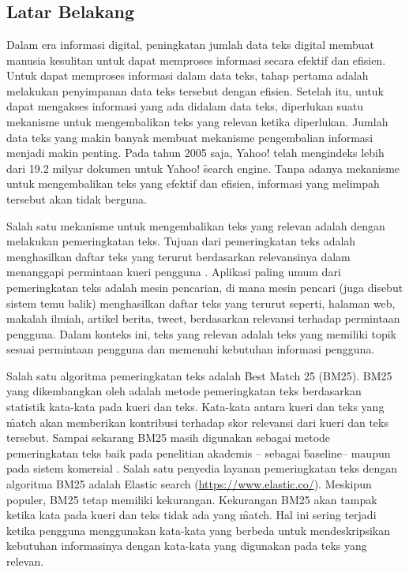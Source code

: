 \chapter{\babSatu}
\label{bab:1}

\section{Latar Belakang}
\label{sec:latar-belakang}

Dalam era informasi digital, peningkatan jumlah data teks digital membuat manusia kesulitan untuk dapat memproses informasi secara efektif dan efisien. Untuk dapat memproses informasi dalam data teks, tahap pertama adalah melakukan penyimpanan data teks tersebut dengan efisien. Setelah itu, untuk dapat mengakses informasi yang ada didalam data teks, diperlukan suatu mekanisme untuk mengembalikan teks yang relevan ketika diperlukan. Jumlah data teks yang makin banyak membuat mekanisme pengembalian informasi menjadi makin penting. Pada tahun 2005 saja, Yahoo! telah mengindeks lebih dari 19.2 milyar dokumen \citep{LETOR} untuk Yahoo! \f{search engine}. Tanpa adanya mekanisme untuk mengembalikan teks yang efektif dan efisien, informasi yang melimpah tersebut akan tidak berguna.

Salah satu mekanisme untuk mengembalikan teks yang relevan adalah dengan melakukan pemeringkatan teks. Tujuan dari pemeringkatan teks adalah menghasilkan daftar teks yang terurut berdasarkan relevansinya dalam menanggapi permintaan kueri pengguna \citep{textrankingsurvey}. Aplikasi paling umum dari pemeringkatan teks adalah mesin pencarian, di mana mesin pencari (juga disebut sistem temu balik) menghasilkan daftar teks yang terurut seperti, halaman web, makalah ilmiah, artikel berita, tweet, berdasarkan relevansi terhadap permintaan pengguna. Dalam konteks ini, teks yang relevan adalah teks yang memiliki topik sesuai permintaan pengguna dan memenuhi kebutuhan informasi pengguna.

Salah satu algoritma pemeringkatan teks adalah \f{Best Match} 25 (BM25). BM25 yang dikembangkan oleh \cite{BM25ori} adalah metode pemeringkatan teks berdasarkan statistik kata-kata pada kueri dan teks. Kata-kata antara kueri dan teks yang \f{match} akan memberikan kontribusi terhadap skor relevansi dari kueri dan teks tersebut. Sampai sekarang BM25 masih digunakan sebagai metode pemeringkatan teks baik pada penelitian akademis -- sebagai \f{baseline}-- maupun pada sistem komersial \citep{textrankingsurvey}. Salah satu penyedia layanan pemeringkatan teks dengan algoritma BM25 adalah Elastic search (\url{https://www.elastic.co/}). Meskipun populer, BM25 tetap memiliki kekurangan. Kekurangan BM25 akan tampak ketika kata pada kueri dan teks tidak ada yang \f{match}. Hal ini sering terjadi ketika pengguna menggunakan kata-kata yang berbeda untuk mendeskripsikan kebutuhan informasinya dengan kata-kata yang digunakan pada teks yang relevan.

